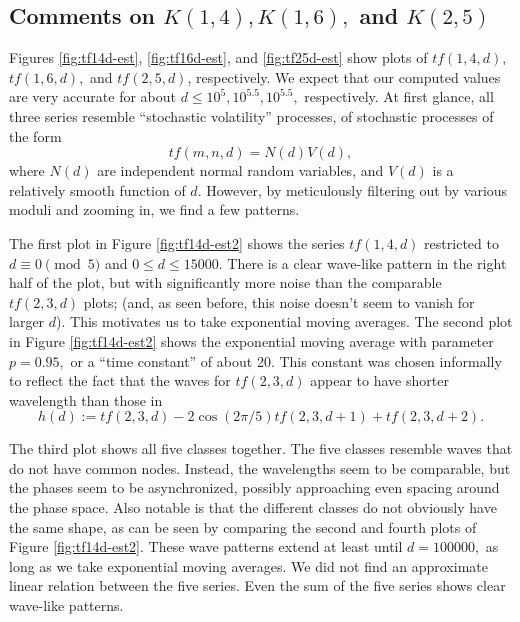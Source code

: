 \documentclass[11pt]{amsart} %
\begin{document}
\subsection{Comments on $K(1,4),  K(1,6),$ and $K(2,5)$}
Figures  \ref{fig:tf14d-est},  \ref{fig:tf16d-est}, and  \ref{fig:tf25d-est} show plots of $tf(1,4,d),$ $tf(1,6,d),$ and $tf(2,5,d)$, respectively. We expect that our computed values are very accurate for about $d \le 10^5, 10^{5.5}, 10^{5.5},$ respectively.%
At first glance, all three series resemble ``stochastic volatility'' processes, of stochastic processes of the form 
\[tf(m,n,d) = N(d) V(d),\] where $N(d)$ are independent normal random variables, and $V(d)$ is a relatively smooth function of $d.$ 
However, by meticulously filtering out by various moduli and zooming in, we find a few patterns. 

The first plot in Figure \ref{fig:tf14d-est2} shows the series $tf(1,4,d)$ restricted to $d \equiv 0 \pmod{5}$ and $0 \le d \le 15000.$ There is a clear wave-like pattern in the right half of the plot, but with significantly more noise than the comparable $tf(2,3,d)$ plots; (and, as seen before, this noise doesn't seem to vanish for larger $d$). This motivates us to take exponential moving averages. The second plot in Figure \ref{fig:tf14d-est2} shows the exponential moving average with parameter $p = 0.95,$ or a ``time constant'' of about 20. This constant was chosen informally to reflect the fact that the waves for $tf(2,3,d)$ appear to have shorter wavelength than those in 
\[h(d) := tf(2,3,d) - 2 \cos(2 \pi/5) tf(2,3,d+1) + tf(2,3,d+2).\]

The third plot shows all five classes together. The five classes resemble waves that do not have common nodes. Instead, the wavelengths seem to be comparable, but the phases seem to be asynchronized, possibly approaching even spacing around the phase space. Also notable is that the different classes do not obviously have the same shape, as can be seen by comparing the second and fourth plots of Figure \ref{fig:tf14d-est2}. These wave patterns extend at least until $d = 100000,$ as long as we take exponential moving averages. We did not find an approximate linear relation between the five series. Even the sum of the five series shows clear wave-like patterns.
\end{document}
